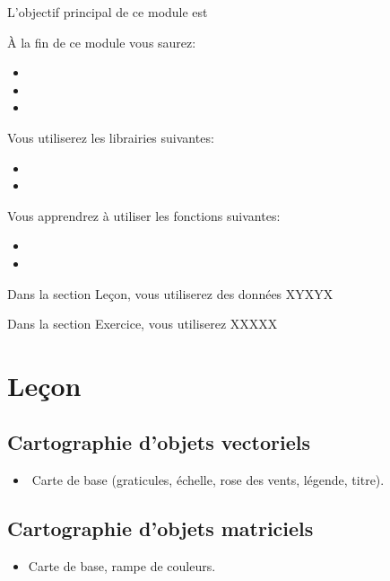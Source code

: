 \documentclass[
  12pt,
]{krantz}
\providecommand{\tightlist}{%
  \setlength{\itemsep}{0pt}\setlength{\parskip}{0pt}}
\begin{document}
L'objectif principal de ce module est

À la fin de ce module vous saurez:

\begin{itemize}
\item
\item
\item
\end{itemize}

Vous utiliserez les librairies suivantes:

\begin{itemize}
\item
\item
\end{itemize}

Vous apprendrez à utiliser les fonctions suivantes:

\begin{itemize}
\item
\item
\end{itemize}

Dans la section Leçon, vous utiliserez des données XYXYX

Dans la section Exercice, vous utiliserez XXXXX

\hypertarget{leuxe7on-4}{%
\section{Leçon}\label{leuxe7on-4}}

\hypertarget{cartographie-dobjets-vectoriels}{%
\subsection{Cartographie d'objets vectoriels}\label{cartographie-dobjets-vectoriels}}

\begin{itemize}
\tightlist
\item
  Carte de base (graticules, échelle, rose des vents, légende, titre).
\end{itemize}

\hypertarget{cartographie-dobjets-matriciels}{%
\subsection{Cartographie d'objets matriciels}\label{cartographie-dobjets-matriciels}}

\begin{itemize}
\tightlist
\item
  Carte de base, rampe de couleurs.
\end{itemize}
\end{document}
